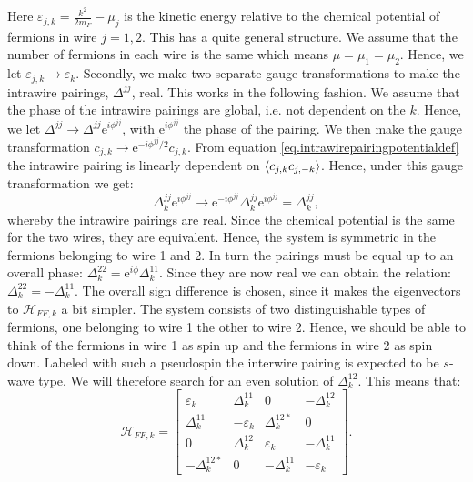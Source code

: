 Here $\varepsilon_{j,k} = \frac{k^2}{2m_F} - \mu_j$ is the kinetic energy relative to the chemical potential of fermions in wire $j = 1, 2$. This has a quite general structure. We assume that the number of fermions in each wire is the same which means $\mu = \mu_1 = \mu_2$. Hence, we let $\varepsilon_{j,k} \to \varepsilon_k$. Secondly, we make two separate gauge transformations to make the intrawire pairings, $\Delta^{jj}$, real. This works in the following fashion. We assume that the phase of the intrawire pairings are global, i.e. not dependent on the $k$. Hence, we let $\Delta^{jj} \to \Delta^{jj} \text{e}^{i\phi^{jj}}$, with $\text{e}^{i\phi^{jj}}$ the phase of the pairing. We then make the gauge transformation $c_{j,k} \to \text{e}^{-i\phi^{jj}/2}c_{j,k}$. From equation \eqref{eq.intrawirepairingpotentialdef} the intrawire pairing is linearly dependent on $\braket{c_{j,k}c_{j,-k}}$. Hence, under this gauge transformation we get:
\begin{equation}
\Delta^{jj}_k \text{e}^{i\phi^{jj}} \to \text{e}^{-i\phi^{jj}}\Delta^{jj}_k \text{e}^{i\phi^{jj}} = \Delta^{jj}_k, \nonumber
\end{equation}
whereby the intrawire pairings are real. Since the chemical potential is the same for the two wires, they are equivalent. Hence, the system is symmetric in the fermions belonging to wire 1 and 2. In turn the pairings must be equal up to an overall phase: $\Delta^{22}_k = \text{e}^{i\phi} \Delta^{11}_k$. Since they are now real we can obtain the relation: $\Delta^{22}_k = -\Delta^{11}_k$. The overall sign difference is chosen, since it makes the eigenvectors to $\mathcal{H}_{FF,k}$ a bit simpler. The system consists of two distinguishable types of fermions, one belonging to wire 1 the other to wire 2. Hence, we should be able to think of the fermions in wire 1 as spin up and the fermions in wire 2 as spin down. Labeled with such a pseudospin the interwire pairing is expected to be $s$-wave type. We will therefore search for an even solution of $\Delta^{12}_k$. This means that:
\begin{equation}
\mathcal{H}_{FF,k} = \begin{bmatrix} \varepsilon_{k}   & \Delta^{11}_k      & 0                 & -\Delta^{12}_{k} \\ 
                                     \Delta^{11}_k     & -\varepsilon_{k}   & \Delta^{12*}_k    & 0 \\ 
                                    0                  & \Delta^{12}_k      & \varepsilon_{k}   & -\Delta^{11}_k \\ 
                                     -\Delta^{12*}_{k} & 0                  & -\Delta^{11}_k     & -\varepsilon_{k} \end{bmatrix}.     
\label{eq.Hamiltoniankernelmomentumspace}                                                  
\end{equation}
